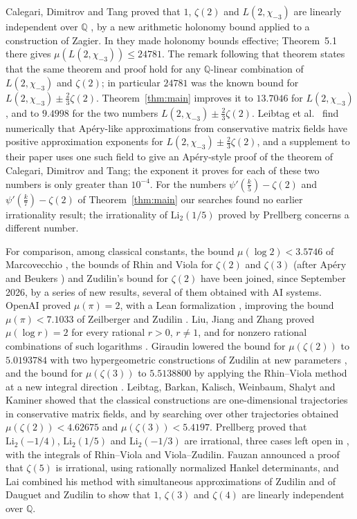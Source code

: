 \documentclass[11pt]{amsart}
\theoremstyle{definition}
\theoremstyle{remark}
\numberwithin{equation}{section}
\newcommand{\Q}{\mathbb Q}
\newcommand{\MuThirdsU}{9.4998}
\newcommand{\MuChi}{13.7046}
\begin{document}
Calegari, Dimitrov and Tang proved that $1$, $\zeta(2)$ and $L(2,\chi_{-3})$ are linearly independent over
$\Q$ \cite{CDT2024}, by a new arithmetic holonomy bound applied to a construction of Zagier. In
\cite{CDT2025} they made holonomy bounds effective; Theorem~5.1 there gives $\mu(L(2,\chi_{-3}))\le24781$.
The remark following that theorem states that the same theorem and proof hold for any $\Q$-linear combination of
$L(2,\chi_{-3})$ and $\zeta(2)$; in particular $24781$ was the known bound for $L(2,\chi_{-3})\pm\frac23\zeta(2)$.
Theorem~\ref{thm:main} improves it to $\MuChi$ for $L(2,\chi_{-3})$, and to $\MuThirdsU$ for the
two numbers $L(2,\chi_{-3})\pm\frac23\zeta(2)$. Leibtag et al.\ \cite{LBKWSK26} find numerically that
Ap\'ery-like approximations from conservative matrix fields have positive approximation exponents for
$L(2,\chi_{-3})\pm\frac23\zeta(2)$, and a supplement to their paper uses one such field to give an Ap\'ery-style
proof of the theorem of Calegari, Dimitrov and Tang; the exponent it proves for each of these two numbers is only greater than $10^{-4}$.
For the numbers $\psi'(\frac k5)-\zeta(2)$ and $\psi'(\frac k7)-\zeta(2)$ of Theorem~\ref{thm:main} our searches found no earlier irrationality result; the irrationality of $\mathrm{Li}_2(1/5)$ proved by Prellberg \cite{Prellberg26}
concerns a different number.

For comparison, among classical constants, the bound $\mu(\log2)<3.5746$ of Marcovecchio \cite{Marcovecchio09},
the bounds of Rhin and Viola for $\zeta(2)$ and $\zeta(3)$ \cite{RhinViola96,RhinViola01} (after Ap\'ery and Beukers
\cite{Apery79,Beukers79}) and Zudilin's bound for $\zeta(2)$ \cite{Zudilin14} have been joined, since September 2026, by a
series of new results, several of them
obtained with AI systems. OpenAI proved $\mu(\pi)=2$, with a Lean formalization \cite{OpenAIPi2026}, improving
the bound $\mu(\pi)<7.1033$ of Zeilberger and Zudilin \cite{ZeilbergerZudilin20}. Liu, Jiang and Zhang proved $\mu(\log r)=2$ for
every rational $r>0$, $r\ne1$, and for nonzero rational combinations of such logarithms \cite{LiuJiangZhang26}. Giraudin
lowered the bound for $\mu(\zeta(2))$ to $5.0193784$ with two hypergeometric constructions of Zudilin \cite{Zudilin14} at
new parameters \cite{Giraudin26}, and the bound for $\mu(\zeta(3))$ to $5.5138800$ by applying the Rhin--Viola method at a
new integral direction \cite{Giraudin26z3}. Leibtag, Barkan, Kalisch, Weinbaum, Shalyt and Kaminer
\cite{LBKWSK26} showed that the classical constructions are one-dimensional trajectories in conservative matrix
fields, and by searching over other trajectories obtained $\mu(\zeta(2))<4.62675$ and $\mu(\zeta(3))<5.4197$. Prellberg
\cite{Prellberg26} proved that $\mathrm{Li}_2(-1/4)$, $\mathrm{Li}_2(1/5)$ and $\mathrm{Li}_2(-1/3)$ are irrational, three
cases left open in \cite{CDT2024}, with the integrals of Rhin--Viola and Viola--Zudilin. Fauzan \cite{Fauzan2026} announced a proof that
$\zeta(5)$ is irrational, using rationally normalized Hankel determinants, and Lai
\cite{Lai2026} combined his method with simultaneous approximations of Zudilin and of Dauguet and Zudilin to show that
$1$, $\zeta(3)$ and $\zeta(4)$ are linearly independent over $\Q$.
\end{document}
